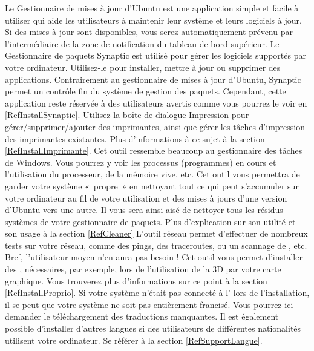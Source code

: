 Le Gestionnaire de mises à jour d'Ubuntu est une application simple et facile à utiliser qui aide les utilisateurs à maintenir leur système et leurs logiciels à jour. Si des mises à jour sont disponibles, vous serez automatiquement prévenu par l'intermédiaire de la zone de notification du tableau de bord supérieur.
Le Gestionnaire de paquets Synaptic est utilisé pour gérer les logiciels supportés par votre ordinateur. Utilisez-le pour installer, mettre à jour ou supprimer des applications. Contrairement au gestionnaire de mises à jour d'Ubuntu, Synaptic permet un contrôle fin du système de gestion des paquets. Cependant, cette application reste réservée à des utilisateurs avertis comme vous pourrez le voir en \ref{RefInstallSynaptic}.
Utilisez la boîte de dialogue Impression pour gérer/supprimer/ajouter des imprimantes, ainsi que gérer les tâches d'impression des imprimantes existantes. Plus d'informations à ce sujet à la section \ref{RefInstallImprimante}.
Cet outil ressemble beaucoup au gestionnaire des tâches de Windows. Vous pourrez y voir les processus (programmes) en cours et l'utilisation du processeur, de la mémoire vive, etc.
Cet outil vous permettra de garder votre système «~propre~» en nettoyant tout ce qui peut s'accumuler sur votre ordinateur au fil de votre utilisation et des mises à jours d'une version d'Ubuntu vers une autre. Il vous sera ainsi aisé de nettoyer tous les résidus systèmes de votre gestionnaire de paquets. Plus d'explication sur son utilité et son usage à la section \ref{RefCleaner} 
L'outil réseau permet d'effectuer de nombreux tests sur votre réseau, comme des pings, des traceroutes, ou un scannage de , etc. Bref, l'utilisateur moyen n'en aura pas besoin !
Cet outil vous permet d'installer des  , nécessaires, par exemple, lors de l'utilisation de la 3D par votre carte graphique. Vous trouverez plus d'informations sur ce point à la section \ref{RefInstallProprio}.
Si votre système n'était pas connecté à l' lors de l'installation, il se peut que votre système ne soit pas entièrement francisé. Vous pourrez ici demander le téléchargement des traductions manquantes. Il est également possible d'installer d'autres langues si des utilisateurs de différentes nationalités utilisent votre ordinateur. Se référer à la section \ref{RefSupportLangue}.
